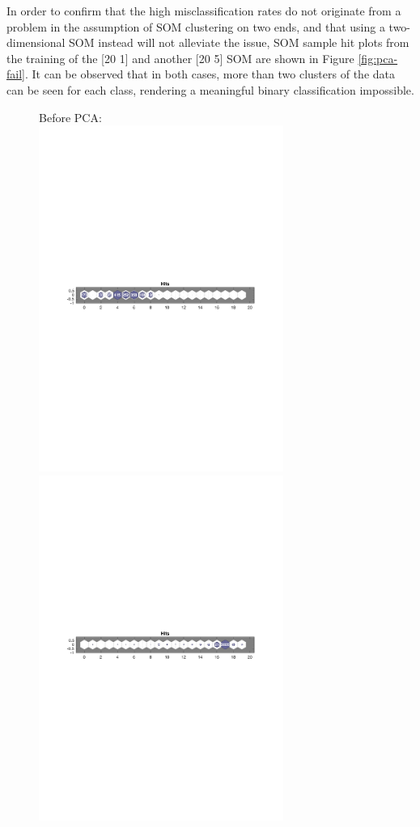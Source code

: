 \documentclass[10pt, oneside]{article}
\begin{document}
In order to confirm that the high misclassification rates do not originate from a problem in the assumption of SOM clustering on two ends, and that using a two-dimensional SOM instead will not alleviate the issue, SOM sample hit plots from the training of the [20 1] and another [20 5] SOM are shown in Figure \ref{fig:pca-fail}. It can be observed that in both cases, more than two clusters of the data can be seen for each class, rendering a meaningful binary classification impossible.

\begin{figure}[h]
\begin{center}
Before PCA:\\
\includegraphics[width=8cm]{nopca-ones.pdf} \includegraphics[width=8cm]{nopca-zeros.pdf}\\

\end{center}
\end{figure}
\end{document}
